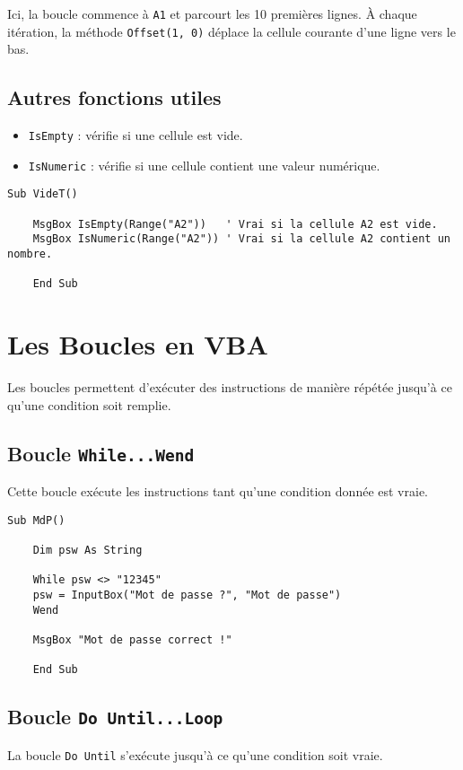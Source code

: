 \documentclass[a4paper,12pt]{report}
\begin{document}
Ici, la boucle commence à \texttt{A1} et parcourt les 10 premières lignes. À chaque itération, la méthode \texttt{Offset(1, 0)} déplace la cellule courante d'une ligne vers le bas.

\subsection{Autres fonctions utiles}
\begin{itemize}
	\item \texttt{IsEmpty} : vérifie si une cellule est vide.
	\item \texttt{IsNumeric} : vérifie si une cellule contient une valeur numérique.
\end{itemize}

\begin{lstlisting}[caption=Exemple de fonctions IsEmpty et IsNumeric]
	Sub VideT()
	
	MsgBox IsEmpty(Range("A2"))   ' Vrai si la cellule A2 est vide.
	MsgBox IsNumeric(Range("A2")) ' Vrai si la cellule A2 contient un nombre.
	
	End Sub
\end{lstlisting}

\section{Les Boucles en VBA}

Les boucles permettent d'exécuter des instructions de manière répétée jusqu'à ce qu'une condition soit remplie.

\subsection{Boucle \texttt{While...Wend}}
Cette boucle exécute les instructions tant qu'une condition donnée est vraie.

\begin{lstlisting}[caption=Exemple de boucle While...Wend]
	Sub MdP()
	
	Dim psw As String
	
	While psw <> "12345"
	psw = InputBox("Mot de passe ?", "Mot de passe")
	Wend
	
	MsgBox "Mot de passe correct !"
	
	End Sub
\end{lstlisting}

\subsection{Boucle \texttt{Do Until...Loop}}
La boucle \texttt{Do Until} s'exécute jusqu'à ce qu'une condition soit vraie.
\end{document}
